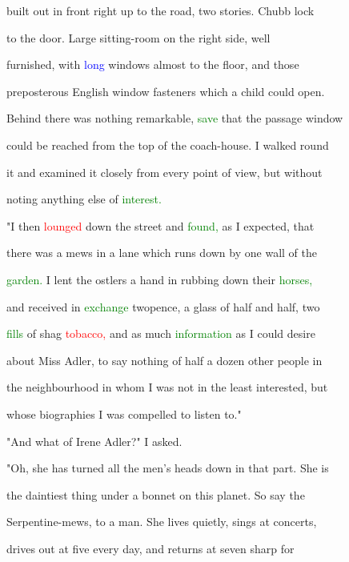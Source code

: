  built out in front right up to the road, two stories. Chubb lock

 to the door. Large sitting-room on the right side, well

 furnished, with \textcolor{blue}{long} windows almost to the floor, and those

 preposterous English window fasteners which a \textcolor{BurntOrange}{child} could open.

 Behind there was nothing \textcolor{BurntOrange}{remarkable,} \textcolor{green}{save} that the passage window

 could be reached from the \textcolor{BurntOrange}{top} of the coach-house. I walked round

 it and examined it closely from every point of view, but without

 noting anything else of \textcolor{green}{interest.}



 "I then \textcolor{red}{lounged} down the street and \textcolor{green}{found,} as I \textcolor{BurntOrange}{expected,} that

 there was a mews in a lane which runs down by one wall of the

 \textcolor{green}{garden.} I lent the ostlers a hand in rubbing down their \textcolor{green}{horses,}

 and received in \textcolor{green}{exchange} twopence, a glass of half and half, two

 \textcolor{green}{fills} of shag \textcolor{red}{tobacco,} and as much \textcolor{green}{information} as I could desire

 about Miss Adler, to say nothing of half a dozen other people in

 the neighbourhood in whom I was not in the least \textcolor{BurntOrange}{interested,} but

 whose biographies I was compelled to listen to."



 "And what of Irene Adler?" I asked.



 "Oh, she has turned all the men's heads down in that part. She is

 the daintiest thing under a bonnet on this planet. So say the

 Serpentine-mews, to a man. She lives quietly, sings at concerts,

 drives out at five every day, and returns at seven sharp for

